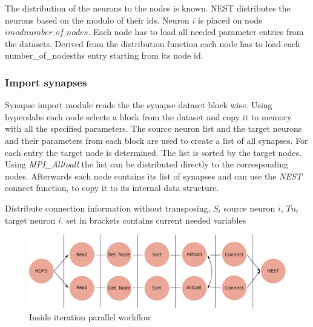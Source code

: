 The distribution of the neurons to the nodes is known. NEST distributes the neurons based on the modulo of their ids. Neuron $i$ is placed on node $i mod number\_of\_nodes$. Each node has to load all needed parameter entries
from the datasets. Derived from the distribution function each node has to load each number\_of\_nodesths entry
starting from its node id.

\newpage
\subsubsection{Import synapses}
Synapse import module reads the the synapse dataset block wise. Using hyperslabs each node selects a block from the
dataset and copy it to memory with all the specified parameters.
The source neuron list and the target neurons and their parameters from each block are used to create a list of all synapses.
For each entry the target node is determined.
The list is sorted by the target nodes.
Using \emph{MPI\_Alltoall} the list can be distributed directly to the corresponding nodes.
Afterwards each node contains its list of synapses and can use the \emph{NEST} connect function, to copy it to its internal data structure.
\begin{algorithm}
\label{alg2}
\caption{Distribute connection information without transposing, $S_i$ source neuron $i$, $Tn_i$ target neuron $i$.
	set in brackets contains current needed variables}
\end{algorithm}



\begin{figure}[ht!]
\centering
\includegraphics[scale=0.4]{pictures/Connect_inside_iteration.eps}
\caption{Inside iteration parallel workflow}
\end{figure}

